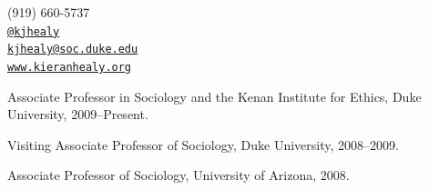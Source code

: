 \documentclass[11pt,article,oneside]{memoir}
\makeatletter
\def\myemail{kjhealy@soc.duke.edu}
\def\myweb{www.kieranhealy.org}
\def\myphone{(919) 660-5737}
\def\mytwitter{@kjhealy}
\makeatother
\begin{document}

\pagestyle{kjh}
\thispagestyle{kjhgit}


\begin{minipage}[t]{2.95in}
  
\end{minipage}
\hfill     
\hfill
\begin{minipage}[t]{1.3in}
  \flushright \footnotesize  \addressblock \myphone \, \faPhone \\ 
  {\scriptsize  \texttt{\href{http://twitter.com/kjhealy}{\mytwitter}} \, \faTwitter }  \\ 
  {\scriptsize  \texttt{\href{mailto:\myemail}{\myemail}} \, \faEnvelope} \\
  {\scriptsize  \texttt{\href{\myweb}{\myweb}} \, \faGlobe}
\end{minipage}

\medskip

\reversemarginpar

\bigskip       


{}

\ind Associate Professor in Sociology and the Kenan Institute for Ethics, Duke University, 2009--Present.      

\ind Visiting Associate Professor of Sociology, Duke University, 2008--2009.

\ind Associate Professor of Sociology, University of Arizona, 2008.
\end{document}
